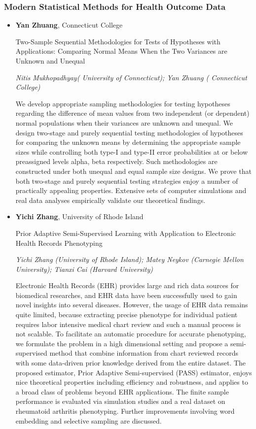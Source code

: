 \subsubsection*{Modern Statistical Methods for Health Outcome Data}

\begin{itemize}
\item \textbf{Yan Zhuang}, Connecticut College

Two-Sample Sequential Methodologies for Tests of Hypotheses with Applications: Comparing Normal Means When the Two Variances are Unknown and Unequal

\emph{\footnotesize Nitis Mukhopadhyay( University of Connecticut); Yan Zhuang ( Connecticut College)}

We develop appropriate sampling methodologies for testing hypotheses regarding the difference of mean values from two independent (or dependent) normal populations when their variances are unknown and unequal. We design two-stage and purely sequential testing methodologies of hypotheses for comparing the unknown means by determining the appropriate sample sizes while controlling both type-I and type-II error probabilities at or below preassigned levels alpha, beta respectively. Such methodologies are constructed under both unequal and equal sample size designs. We prove that both two-stage and purely sequential testing strategies enjoy a number of practically appealing properties. Extensive sets of computer simulations and real data analyses empirically validate our theoretical findings.

\item \textbf{Yichi Zhang}, University of Rhode Island

Prior Adaptive Semi-Supervised Learning with Application to Electronic Health Records Phenotyping

\emph{\footnotesize Yichi Zhang (University of Rhode Island); Matey Neykov (Carnegie Mellon University); Tianxi Cai (Harvard University)}

Electronic Health Records (EHR) provides large and rich data sources for biomedical researches, and EHR data have been successfully used to gain novel insights into several diseases. However, the usage of EHR data remains quite limited,  because extracting precise phenotype for individual patient requires labor intensive medical chart review and such a manual process is not scalable. To facilitate an automatic procedure for accurate phenotyping, we formulate the problem in a high dimensional setting and propose a semi-supervised method that combine information from chart reviewed records with some data-driven prior knowledge derived from the entire dataset. The proposed estimator, Prior Adaptive Semi-supervised (PASS) estimator, enjoys nice theoretical properties including efficiency and robustness, and applies to a broad class of problems beyond EHR applications. The finite sample performance is evaluated via simulation studies and a real dataset on rheumatoid arthritis phenotyping. Further improvements involving word embedding and selective sampling are discussed.


\end{itemize}
